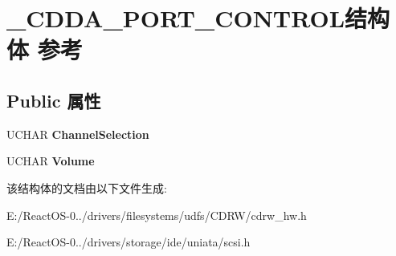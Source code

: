 \hypertarget{struct___c_d_d_a___p_o_r_t___c_o_n_t_r_o_l}{}\section{\+\_\+\+C\+D\+D\+A\+\_\+\+P\+O\+R\+T\+\_\+\+C\+O\+N\+T\+R\+O\+L结构体 参考}
\label{struct___c_d_d_a___p_o_r_t___c_o_n_t_r_o_l}
\subsection*{Public 属性}
\begin{DoxyCompactItemize}
\item 
\mbox{\label{struct___c_d_d_a___p_o_r_t___c_o_n_t_r_o_l_a5068dd3d51d491a91da84d6d6ab48f0a}} 
U\+C\+H\+AR {\bfseries Channel\+Selection}
\item 
\mbox{\label{struct___c_d_d_a___p_o_r_t___c_o_n_t_r_o_l_ac91441631665cef0b516b454259632d7}} 
U\+C\+H\+AR {\bfseries Volume}
\end{DoxyCompactItemize}


该结构体的文档由以下文件生成\+:\begin{DoxyCompactItemize}
\item 
E\+:/\+React\+O\+S-\/0../drivers/filesystems/udfs/\+C\+D\+R\+W/cdrw\+\_\+hw.\+h\item 
E\+:/\+React\+O\+S-\/0../drivers/storage/ide/uniata/scsi.\+h\end{DoxyCompactItemize}
